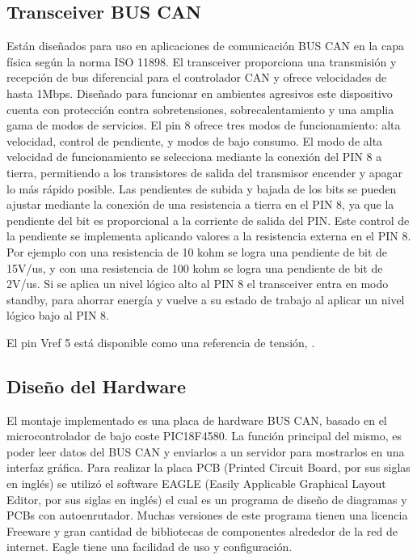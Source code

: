 \subsection{Transceiver BUS CAN }
Están diseñados para uso en aplicaciones de comunicación BUS CAN en la capa física según la norma ISO 11898. El transceiver proporciona una transmisión y recepción de bus diferencial para el controlador CAN y ofrece velocidades de hasta 1Mbps.
Diseñado para funcionar en ambientes agresivos este dispositivo cuenta con protección contra sobretensiones, sobrecalentamiento y una amplia gama de modos de servicios. El pin 8 ofrece tres modos de funcionamiento: alta velocidad, control de pendiente, y modos de bajo consumo.
El modo de alta velocidad de funcionamiento se selecciona mediante la conexión del PIN 8 a tierra, permitiendo a los transistores de salida del transmisor encender y apagar lo más rápido posible.
Las pendientes de subida y bajada de los bits se pueden ajustar mediante la conexión de una resistencia a tierra en el PIN 8, ya que la pendiente del bit es proporcional a la corriente de salida del PIN. Este control de la pendiente se implementa aplicando valores a la resistencia externa en el PIN 8. Por ejemplo con una resistencia de 10 kohm se logra una pendiente de bit de 15V/us,  y con una resistencia de 100 kohm se logra una pendiente de bit de 2V/us. Si se aplica un nivel lógico alto al PIN 8 el transceiver entra en modo standby, para ahorrar energía y vuelve a su estado de trabajo al aplicar un nivel lógico bajo al PIN 8.

El pin Vref 5 está disponible como una referencia de tensión, \cite{sn}.

\subsection{Diseño del Hardware}
El montaje implementado es una placa de hardware BUS CAN, basado en el microcontrolador de bajo coste PIC18F4580. La función principal del mismo, es poder leer datos del BUS
CAN y enviarlos a un servidor para mostrarlos en una interfaz gráfica. Para realizar la placa PCB (Printed Circuit Board, por sus siglas en inglés) se utilizó el software EAGLE (Easily Applicable Graphical Layout Editor, por sus siglas en inglés) el cual es un programa de diseño de diagramas y PCBs con autoenrutador. Muchas versiones de este programa tienen una licencia Freeware y gran cantidad de bibliotecas de componentes alrededor de la red de internet. Eagle tiene una facilidad de uso y configuración.

